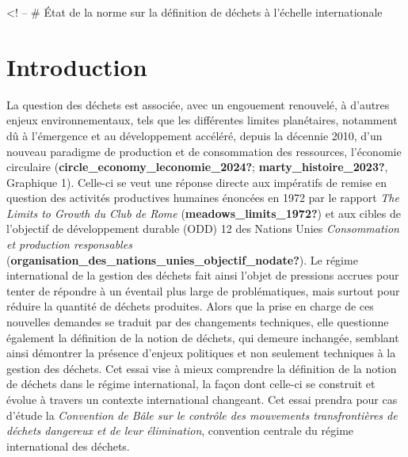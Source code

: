 \documentclass[12pt]{ulaval}
\date{Décembre 2024}
\begin{document}
  \maketitle

\frontmatter %
\pagestyle{plain} %
\setcounter{page}{2}



% 
  \hypersetup{linkcolor=black}
   \setcounter{tocdepth}{2}
  \tableofcontents

  \listoftables

  \listoffigures


% 
\mainmatter %
\pagestyle{fancyplain} %

\doublespace

\textless! -- \# État de la norme sur la définition de déchets à l'échelle internationale

\section{Introduction}\label{introduction}

La question des déchets est associée, avec un engouement renouvelé, à d'autres enjeux environnementaux, tels que les différentes limites planétaires, notamment dû à l'émergence et au développement accéléré, depuis la décennie 2010, d'un nouveau paradigme de production et de consommation des ressources, l'économie circulaire (\textbf{circle\_economy\_leconomie\_2024?}; \textbf{marty\_histoire\_2023?}, Graphique 1). Celle-ci se veut une réponse directe aux impératifs de remise en question des activités productives humaines énoncées en 1972 par le rapport \emph{The Limits to Growth du Club de Rome} (\textbf{meadows\_limits\_1972?}) et aux cibles de l'objectif de développement durable (ODD) 12 des Nations Unies \emph{Consommation et production responsables} (\textbf{organisation\_des\_nations\_unies\_objectif\_nodate?}). Le régime international de la gestion des déchets fait ainsi l'objet de pressions accrues pour tenter de répondre à un éventail plus large de problématiques, mais surtout pour réduire la quantité de déchets produites. Alors que la prise en charge de ces nouvelles demandes se traduit par des changements techniques, elle questionne également la définition de la notion de déchets, qui demeure inchangée, semblant ainsi démontrer la présence d'enjeux politiques et non seulement techniques à la gestion des déchets. Cet essai vise à mieux comprendre la définition de la notion de déchets dans le régime international, la façon dont celle-ci se construit et évolue à travers un contexte international changeant. Cet essai prendra pour cas d'étude la \emph{Convention de Bâle sur le contrôle des mouvements transfrontières de déchets dangereux et de leur élimination}, convention centrale du régime international des déchets.
\end{document}
